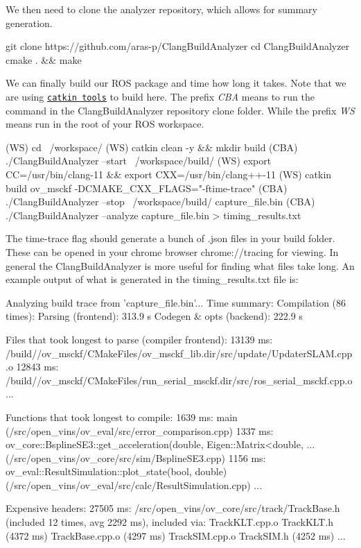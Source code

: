 We then need to clone the analyzer repository, which allows for summary generation.


\begin{DoxyCode}
git clone https://github.com/aras-p/ClangBuildAnalyzer
cd ClangBuildAnalyzer
cmake . && make
\end{DoxyCode}


We can finally build our R\+OS package and time how long it takes. Note that we are using \href{https://catkin-tools.readthedocs.io/en/latest/}{\tt catkin tools} to build here. The prefix {\itshape C\+BA} means to run the command in the Clang\+Build\+Analyzer repository clone folder. While the prefix {\itshape WS} means run in the root of your R\+OS workspace.


\begin{DoxyCode}
(WS) cd ~/workspace/
(WS) catkin clean -y && mkdir build
(CBA) ./ClangBuildAnalyzer --start ~/workspace/build/
(WS) export CC=/usr/bin/clang-11 && export CXX=/usr/bin/clang++-11
(WS) catkin build ov\_msckf -DCMAKE\_CXX\_FLAGS="-ftime-trace"
(CBA) ./ClangBuildAnalyzer --stop ~/workspace/build/ capture\_file.bin
(CBA) ./ClangBuildAnalyzer --analyze capture\_file.bin > timing\_results.txt
\end{DoxyCode}


The {\ttfamily time-\/trace} flag should generate a bunch of .json files in your build folder. These can be opened in your chrome browser {\ttfamily chrome\+://tracing} for viewing. In general the Clang\+Build\+Analyzer is more useful for finding what files take long. An example output of what is generated in the timing\+\_\+results.\+txt file is\+:


\begin{DoxyCode}
Analyzing build trace from 'capture\_file.bin'...
     Time summary:
Compilation (86 times):
  Parsing (frontend):          313.9 s
  Codegen & opts (backend):    222.9 s

     Files that took longest to parse (compiler frontend):
 13139 ms: /build//ov\_msckf/CMakeFiles/ov\_msckf\_lib.dir/src/update/UpdaterSLAM.cpp.o
 12843 ms: /build//ov\_msckf/CMakeFiles/run\_serial\_msckf.dir/src/ros\_serial\_msckf.cpp.o
 ...
 
     Functions that took longest to compile:
  1639 ms: main (/src/open\_vins/ov\_eval/src/error\_comparison.cpp)
  1337 ms: ov\_core::BsplineSE3::get\_acceleration(double, Eigen::Matrix<double, ...
       (/src/open\_vins/ov\_core/src/sim/BsplineSE3.cpp)
  1156 ms: ov\_eval::ResultSimulation::plot\_state(bool, double)
       (/src/open\_vins/ov\_eval/src/calc/ResultSimulation.cpp)
  ...

     Expensive headers: 
 27505 ms: /src/open\_vins/ov\_core/src/track/TrackBase.h (included 12 times, avg 2292 ms), included via:
   TrackKLT.cpp.o TrackKLT.h  (4372 ms)
   TrackBase.cpp.o  (4297 ms)
   TrackSIM.cpp.o TrackSIM.h  (4252 ms)
   ...
\end{DoxyCode}


